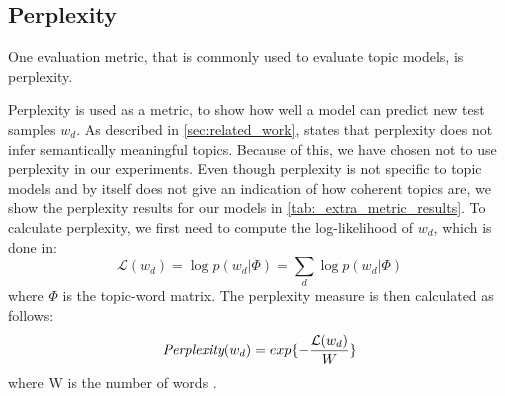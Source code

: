 \subsection{Perplexity}\label{app:perplexity}
One evaluation metric, that is commonly used to evaluate topic models, is perplexity.

Perplexity is used as a metric, to show how well a model can predict new test samples $w_d$.
As described in \autoref{sec:related_work}, \citet{tea_leaves} states that perplexity does not infer semantically meaningful topics.
Because of this, we have chosen not to use perplexity in our experiments.
Even though perplexity is not specific to topic models and by itself does not give an indication of how coherent topics are, we show the perplexity results for our models in \autoref{tab:_extra_metric_results}.
To calculate perplexity, we first need to compute the log-likelihood of $w_d$, which is done in:
\begin{equation}\label{eq:likelihood}
	\mathcal{L}(w_d) = \log p(w_d|\Phi) = \sum_{d} \log p(w_d|\Phi)
\end{equation}
\noindent where $\Phi$ is the topic-word matrix.
The perplexity measure is then calculated as follows:
\begin{equation}
	\emph{Perplexity}(w_d) = exp \{-\frac{\mathcal{L}(w_d)}{W}\}
\end{equation}
\noindent where W is the number of words \cite{de2008evaluating}.

